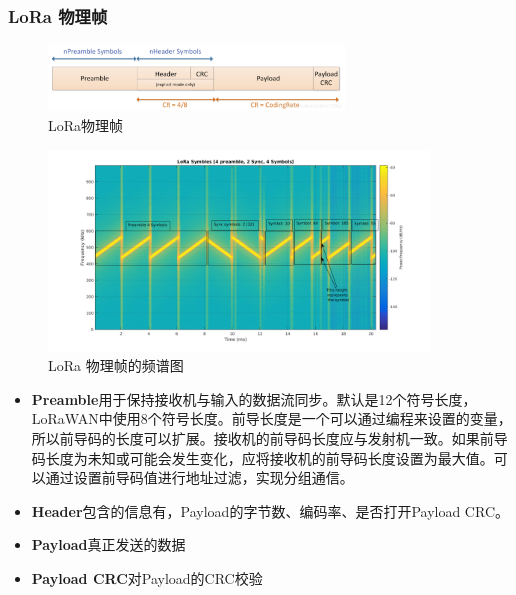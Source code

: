 \documentclass[scheme=chinese,a4paper]{article}
\begin{document}
\subsubsection{LoRa 物理帧}
\begin{figure}[H]
\centering
\includegraphics[width=0.7\textwidth]{lora_phy_frame.png}
\caption{LoRa物理帧\cite{lora_unknown}}
\end{figure}
\begin{figure}[H]
\centering
\includegraphics[width=0.9\textwidth]{Lora_sym.png}
\caption{LoRa 物理帧的频谱图\cite{lora_study}}
\end{figure}
\begin{itemize}
  \item\textbf{Preamble}用于保持接收机与输入的数据流同步。默认是12个符号长度，LoRaWAN中使用8个符号长度。前导长度是一个可以通过编程来设置的变量，所以前导码的长度可以扩展。接收机的前导码长度应与发射机一致。如果前导码长度为未知或可能会发生变化，应将接收机的前导码长度设置为最大值。可以通过设置前导码值进行地址过滤，实现分组通信。
  \item\textbf{Header}包含的信息有，Payload的字节数、编码率、是否打开Payload CRC。
  \item\textbf{Payload}真正发送的数据
  \item\textbf{Payload CRC}对Payload的CRC校验
\end{itemize}
\end{document}
